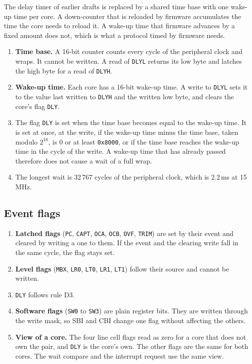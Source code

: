 \documentclass[10pt,a4paper]{article}
\newcommand{\reg}[1]{\texttt{#1}}
\begin{document}
The delay timer of earlier drafts is replaced by a shared time base with one wake-up time per core. A
down-counter that is reloaded by firmware accumulates the time the core needs to reload it. A wake-up time
that firmware advances by a fixed amount does not, which is what a protocol timed by firmware needs.

\begin{enumerate}[label=\textbf{D\arabic*},leftmargin=2.6em]
\item \textbf{Time base.} A 16-bit counter counts every cycle of the peripheral clock and wraps. It cannot be
written. A read of \reg{DLYL} returns its low byte and latches the high byte for a read of \reg{DLYH}.
\item \textbf{Wake-up time.} Each core has a 16-bit wake-up time. A write to \reg{DLYL} sets it to the value last
written to \reg{DLYH} and the written low byte, and clears the core's flag \reg{DLY}.
\item The flag \reg{DLY} is set when the time base becomes equal to the wake-up time. It is set at once, at the write, if the wake-up time minus the time base, taken modulo $2^{16}$, is 0 or at least \texttt{0x8000}, or if the time base reaches the wake-up time in the cycle of the write. A
wake-up time that has already passed therefore does not cause a wait of a full wrap.
\item The longest wait is 32\,767 cycles of the peripheral clock, which is 2.2\,ms at 15\,MHz.
\end{enumerate}

\subsection{Event flags}

\begin{enumerate}[label=\textbf{E\arabic*},leftmargin=2.6em]
\item \textbf{Latched flags} (\reg{PC}, \reg{CAPT}, \reg{OCA}, \reg{OCB}, \reg{OVF}, \reg{TRIM}) are set by their
event and cleared by writing a one to them. If the event and the clearing write fall in the same cycle, the
flag stays set.
\item \textbf{Level flags} (\reg{MBX}, \reg{LR0}, \reg{LT0}, \reg{LR1}, \reg{LT1}) follow their source and cannot be written.
\item \reg{DLY} follows rule D3.
\item \textbf{Software flags} (\reg{SW0} to \reg{SW3}) are plain register bits. They are written through the write
mask, so SBI and CBI change one flag without affecting the others.
\item \textbf{View of a core.} The four line cell flags read as zero for a core that does not own the pair, and \reg{DLY} is the core's own. The other flags are the same for both cores. The wait compare and
the interrupt request use the same view.
\end{enumerate}
\end{document}
